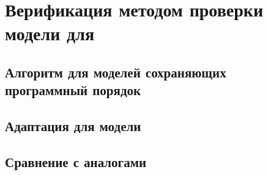 \chapter{Верификация методом проверки модели для \WkmS}
\label{ch:mc-weakestmo2}

\section{Алгоритм \genmc для моделей сохраняющих программный порядок}

\section{Адаптация \genmc для модели \WkmS}

\section{Сравнение с аналогами}
